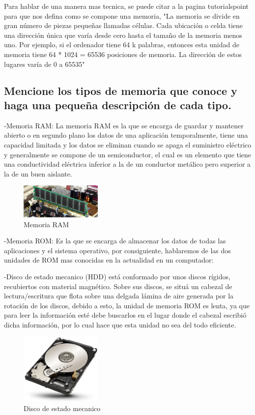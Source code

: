 \documentclass{article}
\begin{document}
Para hablar de una manera mas tecnica, se puede citar a la pagina tutorialspoint para que nos defina como se compone una memoria, \cite{Memoria} "La memoria se divide en gran número de piezas pequeñas llamadas células. Cada ubicación o celda tiene una dirección única que varía desde cero hasta el tamaño de la memoria menos uno. Por ejemplo, si el ordenador tiene 64 k palabras, entonces esta unidad de memoria tiene 64 * 1024 = 65536 posiciones de memoria. La dirección de estos lugares varía de 0 a 65535"

\subsection{Mencione los tipos de memoria que conoce y haga una pequeña descripción de cada tipo.}
-Memoria RAM: La memoria RAM es la que se encarga de guardar y mantener  abierto  o  en  segundo  plano  los  datos  de  una  aplicación  temporalmente, tiene una capacidad limitada y los datos se eliminan cuando se apaga el suministro  eléctrico  y  generalmente  se compone  de  un  semiconductor,  el  cual  es  un elemento  que  tiene  una  conductividad  eléctrica  inferior  a  la  de  un  conductor metálico pero superior a la de un buen aislante. \newline

\begin{figure}[h]
\includegraphics[width=4cm]{Memoria.jpg}
\centering
\caption{Memoria RAM}
\end{figure}

-Memoria ROM: Es la que se encarga de almacenar los datos de todas las aplicaciones y el sistema operativo, por consiguiente, hablaremos de las dos unidades de ROM mas conocidas en la actualidad en un computador:

-Disco de estado mecanico (HDD) está conformado por unos discos rígidos, recubiertos  con  material  magnético.  Sobre  sus  discos,  se  situá  un  cabezal  de lectura/escritura  que  flota  sobre  una delgada  lámina  de  aire  generada  por  la rotación de  los  discos,  debido  a  esto,  la unidad  de  memoria  ROM  es  lenta, ya que para leer la información esté debe buscarlos en el lugar donde el cabezal escribió  dicha  información,  por  lo  cual  hace  que  esta  unidad  no  sea  del  todo eficiente.
\newline
\begin{figure}[h]
\includegraphics[width=4cm]{HDD.jpg}
\centering
\caption{Disco de estado mecanico}
\end{figure}
\end{document}
